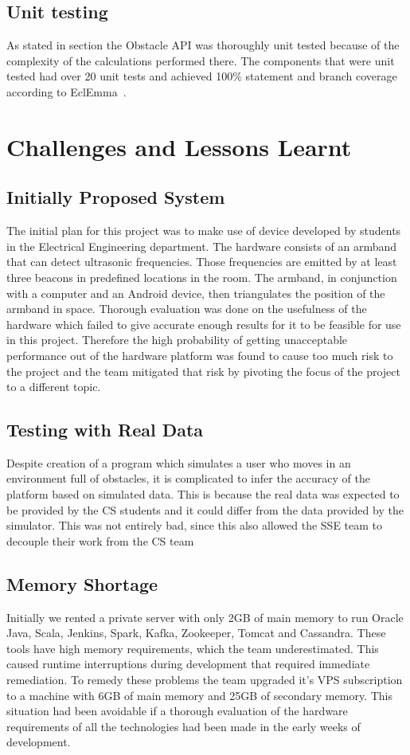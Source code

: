 \documentclass[prodmode,acmtosem]{acmsmall} %
\begin{document}
\subsection{Unit testing}
As stated in section the Obstacle API was thoroughly unit tested because of the complexity of the calculations performed there. The components that were unit tested had over 20 unit tests and achieved 100\% statement and branch coverage according to EclEmma~\cite{ECLEmma}.

\section{Challenges and Lessons Learnt}
\subsection{Initially Proposed System}
\label{sec:Prelim}
The initial plan for this project was to make use of device developed by students in the Electrical Engineering department. The hardware consists of an armband that can detect ultrasonic frequencies. Those frequencies are emitted by at least three beacons in predefined locations in the room. The armband, in conjunction with a computer and an Android device, then triangulates the position of the armband in space. Thorough evaluation was done on the usefulness of the hardware which failed to give accurate enough results for it to be feasible for use in this project. Therefore the high probability of getting unacceptable performance out of the hardware platform was found to cause too much risk to the project and the team mitigated that risk by pivoting the focus of the project to a different topic.

\subsection{Testing with Real Data}
Despite creation of a program which simulates a user who moves in an environment full of obstacles, it is complicated to infer the accuracy of the platform based on simulated data. This is because the real data was expected to be provided by the CS students and it could differ from the data provided by the simulator. This was not entirely bad, since this also allowed the SSE team to decouple their work from the CS team

\subsection{Memory Shortage}
Initially we rented a private server with only 2GB of main memory to run Oracle Java, Scala, Jenkins, Spark, Kafka, Zookeeper, Tomcat and Cassandra. These tools have high memory requirements, which the team underestimated. This caused runtime interruptions during development that required immediate remediation. To remedy these problems the team upgraded it's VPS subscription to a machine with 6GB of main memory and 25GB of secondary memory.  This situation had been avoidable if a thorough evaluation of the hardware requirements of all the technologies had been made in the early weeks of development.
\end{document}
